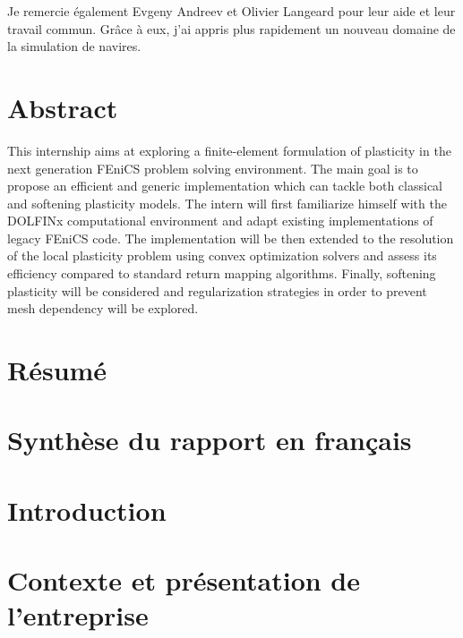 \documentclass[12pt]{article}
\begin{document}
Je remercie également Evgeny Andreev et Olivier Langeard pour leur aide et leur travail commun. Grâce à eux, j'ai appris plus rapidement un nouveau domaine de la simulation de navires.

\newpage
\section*{\centering Abstract}
This internship aims at exploring a finite-element formulation of plasticity in the next generation FEniCS problem solving environment. The main goal is to propose an efficient and generic implementation which can tackle both classical and softening plasticity models. The intern will first familiarize himself with the DOLFINx computational environment and adapt existing implementations of legacy FEniCS code. The implementation will be then extended to the resolution of the local plasticity problem using convex optimization solvers and assess its efficiency compared to standard return mapping algorithms. Finally, softening plasticity will be considered and regularization strategies in order to prevent mesh dependency will be explored.

\newpage
\section*{\centering Résumé}

\newpage
\section*{\centering Synthèse du rapport en français}

\renewcommand{\listtablename}{\centering Liste des tableaux}
\renewcommand{\contentsname}{\centering Table des matières}
\renewcommand{\listfigurename}{\centering Liste des figures}
\newpage
\tableofcontents
\newpage
\listoftables
\newpage
\listoffigures
\newpage

\section*{Introduction}

\newpage
\section{Contexte et présentation de l’entreprise}
\end{document}
